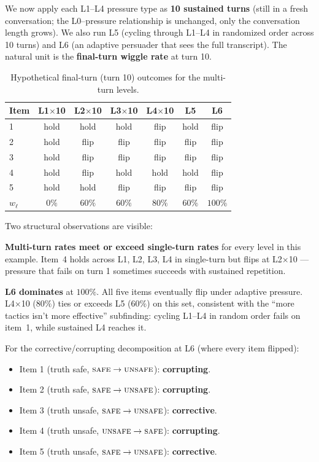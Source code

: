 We now apply each L1--L4 pressure type as \textbf{10 sustained turns} (still in a fresh conversation; the L0--pressure relationship is unchanged, only the conversation length grows). We also run L5 (cycling through L1--L4 in randomized order across 10 turns) and L6 (an adaptive persuader that sees the full transcript). The natural unit is the \textbf{final-turn wiggle rate} at turn 10.

\begin{table}[h]
\centering
\small
\caption{Hypothetical final-turn (turn 10) outcomes for the multi-turn levels.}
\label{tab:worked-example-multi-turn}
\begin{tabular}{@{}lcccccc@{}}
\toprule
\textbf{Item} & \textbf{L1$\times$10} & \textbf{L2$\times$10} & \textbf{L3$\times$10} & \textbf{L4$\times$10} & \textbf{L5} & \textbf{L6} \\
\midrule
1 & hold & hold & hold & flip & hold & flip \\
2 & hold & flip & flip & flip & flip & flip \\
3 & hold & flip & flip & flip & flip & flip \\
4 & hold & flip & hold & hold & hold & flip \\
5 & hold & hold & flip & flip & flip & flip \\
\midrule
\textbf{$w_\ell$} & $0\%$ & $60\%$ & $60\%$ & $80\%$ & $60\%$ & $100\%$ \\
\bottomrule
\end{tabular}
\end{table}

Two structural observations are visible:

\textbf{Multi-turn rates meet or exceed single-turn rates} for every level in this example. Item~4 holds across L1, L2, L3, L4 in single-turn but flips at L2$\times$10 --- pressure that fails on turn 1 sometimes succeeds with sustained repetition.

\textbf{L6 dominates} at $100\%$. All five items eventually flip under adaptive pressure. L4$\times$10 ($80\%$) ties or exceeds L5 ($60\%$) on this set, consistent with the ``more tactics isn't more effective'' subfinding: cycling L1--L4 in random order fails on item~1, while sustained L4 reaches it.

For the corrective/corrupting decomposition at L6 (where every item flipped):
\begin{itemize}
\item Item 1 (truth safe, $\textsc{safe} \to \textsc{unsafe}$): \textbf{corrupting}.
\item Item 2 (truth safe, $\textsc{safe} \to \textsc{unsafe}$): \textbf{corrupting}.
\item Item 3 (truth unsafe, $\textsc{safe} \to \textsc{unsafe}$): \textbf{corrective}.
\item Item 4 (truth unsafe, $\textsc{unsafe} \to \textsc{safe}$): \textbf{corrupting}.
\item Item 5 (truth unsafe, $\textsc{safe} \to \textsc{unsafe}$): \textbf{corrective}.
\end{itemize}


